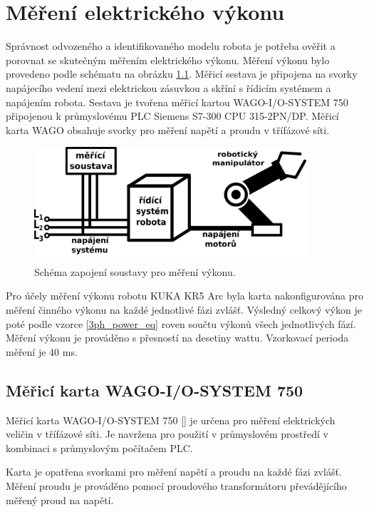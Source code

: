 \chapter{Měření elektrického výkonu}
\label{mereni_el_vykonu_sec}
Správnost odvozeného a identifikovaného modelu robota je potřeba ověřit a porovnat se skutečným měřením elektrického výkonu. Měření výkonu bylo provedeno podle schématu na obrázku \ref{mereni_vykonu_pic}. Měřicí sestava je připojena na svorky napájecího vedení mezi elektrickou zásuvkou a skříní s řídicím systémem a napájením robota. Sestava je tvořena měřicí kartou WAGO-I/O-SYSTEM 750 připojenou k průmyslovému PLC Siemens S7-300 CPU 315-2PN/DP. Měřicí karta WAGO obsahuje svorky pro měření napětí a proudu v třífázové síti. 

\begin{figure}[ht]
\includegraphics[width=0.9\textwidth]{mereni_vykonu_obr}
\caption{Schéma zapojení soustavy pro měření výkonu.}
\label{mereni_vykonu_pic}
\end{figure}

Pro účely měření výkonu robotu KUKA KR5 Arc byla karta nakonfigurována pro měření činného výkonu na každé jednotlivé fázi zvlášť. Výsledný celkový výkon je poté podle vzorce \ref{3ph_power_eq} roven součtu výkonů všech jednotlivých fází. Měření výkonu je prováděno s přesností na desetiny wattu. Vzorkovací perioda měření je 40 ms. 

\section{Měřicí karta WAGO-I/O-SYSTEM 750}

Měřicí karta WAGO-I/O-SYSTEM 750 [\cite{wago}] je určena pro měření elektrických veličin v třífázové síti. Je navržena pro použití v průmyslovém prostředí v kombinaci s průmyslovým počítačem PLC. 

Karta je opatřena svorkami pro měření napětí a proudu na každé fázi zvlášť. Měření proudu je prováděno pomocí proudového transformátoru převádějícího měřený proud na napětí. 

